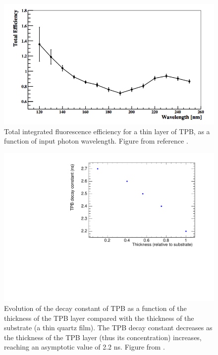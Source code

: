 \documentclass[review]{elsarticle}
\begin{document}
\begin{figure}[!htbp]
	\centering
	\includegraphics[scale=0.6]{../img/TPBEfficiency.png}
	\caption{Total integrated fluorescence efficiency for a thin layer of TPB, as a function of input  photon wavelength.
	Figure from reference \cite{Gehman:2011xm}.  }\label{fig.tpbeff} 
\end{figure}

\begin{figure}[!htbp]
	\centering
	\includegraphics[scale=0.6]{../img/TPBdecays.pdf}
	\caption{Evolution of the decay constant of TPB as a function of the thickness of the TPB layer compared
	with the thickness of the substrate (a thin quartz film). The TPB decay constant decreases as the thickness of the TPB layer (thus its concentration) increases, reaching an asymptotic value of 2.2 ns. Figure from \cite{TPBtau}.  }\label{fig.tpbtau} 
\end{figure}
\end{document}
